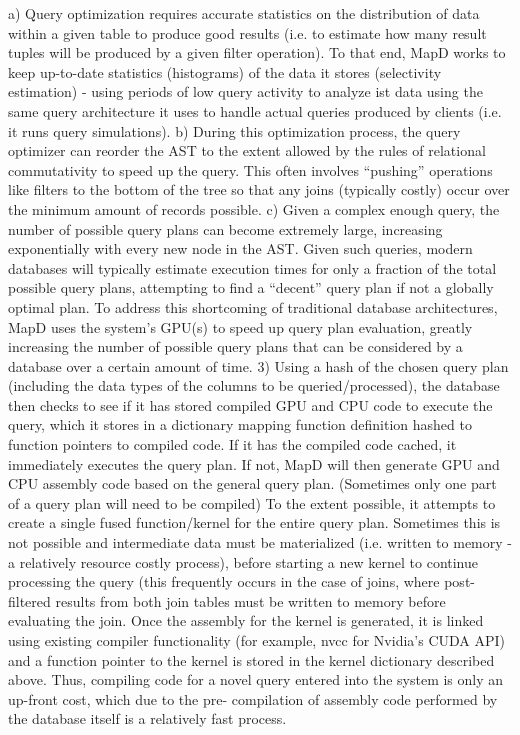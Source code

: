 \documentclass[twocolumn]{article}
\begin{document}
a) Query optimization requires accurate statistics on the distribution of data within a given table to produce good results (i.e. to estimate how many result tuples will be produced by a given filter operation). To that end, MapD works to keep up-to-date statistics (histograms) of the data it stores (selectivity estimation) - using periods of low query activity to analyze ist data using the same query architecture it uses to handle actual queries produced by clients (i.e. it runs query simulations).
b) During this optimization process, the query optimizer can reorder the AST to the extent allowed by the rules of relational commutativity to speed up the query. This often involves “pushing” operations like filters to the bottom of the tree so that any joins (typically costly) occur over the minimum amount of records possible.
c) Given a complex enough query, the number of possible query plans can become extremely large, increasing exponentially with every new node in the AST. Given such queries, modern databases will typically estimate execution times for only a fraction of the total possible query plans, attempting to find a “decent” query plan if not a globally optimal plan. To address this shortcoming of traditional database architectures, MapD uses the system’s GPU(s) to speed up query plan evaluation, greatly increasing the number of possible query plans that can be considered by a database over a certain amount of time.
3) Using a hash of the chosen query plan (including the data types of the columns to be queried/processed), the database then checks to see if it has stored compiled GPU and CPU code to execute the query, which it stores in a dictionary mapping function definition hashed to function pointers to compiled code. If it has the compiled code cached, it immediately executes the query plan. If not, MapD will then generate GPU and CPU assembly code based on the general query plan. (Sometimes only one part of a query plan will need to be compiled) To the extent possible, it attempts to create a single fused function/kernel for the entire query plan. Sometimes this is not possible and intermediate data must be materialized (i.e. written to memory - a relatively resource costly process), before starting a new kernel to continue processing the query (this frequently occurs in the case of joins, where post-filtered results from both join tables must be written to memory before evaluating the join. Once the assembly for the kernel is generated, it is linked using existing compiler functionality (for example, nvcc for Nvidia’s CUDA API) and a function pointer to the kernel is stored in the kernel dictionary described above. Thus, compiling code for a novel query entered into the system is only an up-front cost, which due to the pre- compilation of assembly code performed by the database itself is a relatively fast process.
\end{document}
